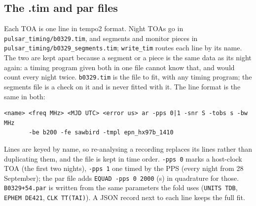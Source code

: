 \documentclass[11pt,a4paper]{article}
\newcommand{\code}[1]{\texttt{#1}}
\begin{document}
\subsection{The .tim and par files}
Each TOA is one line in tempo2 format. Night TOAs go in \code{pulsar\_timing/b0329.tim}, and segments and monitor pieces in \code{pulsar\_timing/b0329\_segments.tim}; \code{write\_tim} routes each line by its name. The two are kept apart because a segment or a piece is the same data as its night again: a timing program given both in one file cannot know that, and would count every night twice. \code{b0329.tim} is the file to fit, with any timing program; the segments file is a check on it and is never fitted with it. The line format is the same in both:
\begin{verbatim}
<name> <freq MHz> <MJD UTC> <error us> ar -pps 0|1 -snr S -tobs s -bw MHz
       -be b200 -fe sawbird -tmpl epn_hx97b_1410
\end{verbatim}
Lines are keyed by name, so re-analysing a recording replaces its lines rather than duplicating them, and the file is kept in time order. \code{-pps 0} marks a host-clock TOA (the first two nights), \code{-pps 1} one timed by the PPS (every night from 28 September); the par file adds \code{EQUAD -pps 0 2000} (\textmu s) in quadrature for those. \code{B0329+54.par} is written from the same parameters the fold uses (\code{UNITS TDB}, \code{EPHEM DE421}, \code{CLK TT(TAI)}). A JSON record next to each line keeps the full fit.

\end{document}
